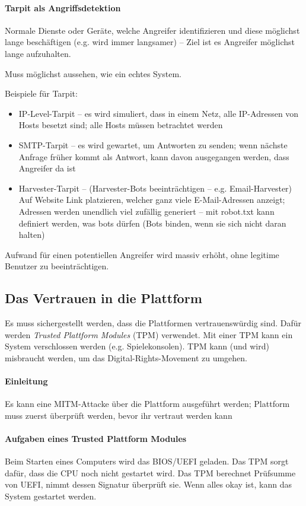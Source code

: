 \documentclass[a4paper,12pt]{article}
\begin{document}
\paragraph{Tarpit als Angriffsdetektion}
Normale Dienste oder Geräte, welche Angreifer identifizieren und diese möglichst lange beschäftigen (e.g. wird immer langsamer) -- Ziel ist es Angreifer möglichst lange aufzuhalten.

Muss möglichst aussehen, wie ein echtes System.

Beispiele für Tarpit:
\begin{itemize}
\item IP-Level-Tarpit -- es wird simuliert, dass in einem Netz, alle IP-Adressen von Hosts besetzt sind; alle Hosts müssen betrachtet werden
\item SMTP-Tarpit -- es wird gewartet, um Antworten zu senden; wenn nächste Anfrage früher kommt als Antwort, kann davon ausgegangen werden, dass Angreifer da ist
\item Harvester-Tarpit -- (Harvester-Bots beeinträchtigen -- e.g. Email-Harvester) Auf Website Link platzieren, welcher ganz viele E-Mail-Adressen anzeigt; Adressen werden unendlich viel zufällig generiert -- mit robot.txt kann definiert werden, was bots dürfen (Bots binden, wenn sie sich nicht daran halten)
\end{itemize}

Aufwand für einen potentiellen Angreifer wird massiv erhöht, ohne legitime Benutzer zu beeinträchtigen.

\subsection{Das Vertrauen in die Plattform}
Es muss sichergestellt werden, dass die Plattformen vertrauenswürdig sind. Dafür werden \emph{Trusted Plattform Modules} (TPM) verwendet. Mit einer TPM kann ein System verschlossen werden (e.g. Spielekonsolen). TPM kann (und wird) misbraucht werden, um das Digital-Rights-Movement zu umgehen.

\paragraph{Einleitung}
Es kann eine MITM-Attacke über die Plattform ausgeführt werden; Plattform muss zuerst überprüft werden, bevor ihr vertraut werden kann

\paragraph{Aufgaben eines Trusted Plattform Modules}
Beim Starten eines Computers wird das BIOS/UEFI geladen. Das TPM sorgt dafür, dass die CPU noch nicht gestartet wird. Das TPM berechnet Prüfsumme von UEFI, nimmt dessen Signatur überprüft sie. Wenn alles okay ist, kann das System gestartet werden.
\end{document}
